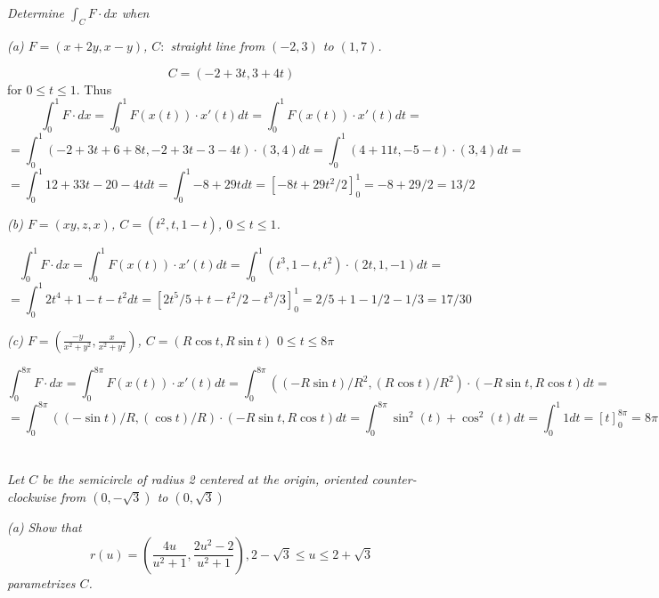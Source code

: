 \documentclass[11pt,oneside,titlepage]{book}
\begin{document}
\section{}

\textit{Determine $\int_C{F \cdot dx}$ when}

\textit{(a) $F = (x + 2y, x - y)$, $C: $ straight line from $(-2, 3)$ to $(1, 7)$.}

$$C = (-2 + 3t, 3 + 4t) $$
for $0 \leq t \leq 1$. Thus
$$\int_0^1{F \cdot dx} = \int_0^1{F(x(t)) \cdot x'(t) dt} =
\int_0^1{F(x(t)) \cdot x'(t) dt} = $$
$$ = \int_0^1{(-2 + 3t + 6 + 8t, -2 + 3t - 3 - 4t) \cdot (3, 4) dt} =
\int_0^1{(4 + 11t, -5 - t) \cdot (3, 4) dt} = 
$$
$$
=  \int_0^1{12 + 33t - 20  - 4t dt} =  \int_0^1{- 8 + 29tdt} = [-8t + 29t^2/2]_0^1 = -8 + 29/2 =
13/2
$$

\textit{(b) $F = (xy, z, x)$, $C = (t^2, t, 1 - t)$, $0 \leq t \leq 1$.}

$$\int_0^1{F \cdot dx } = \int_0^1{F(x(t)) \cdot x'(t) dt } =
\int_0^1{(t^3, 1 - t, t^2) \cdot (2t, 1, -1) dt } = $$
$$ =
\int_0^1{2t^4 + 1 - t - t^2dt } = [2t^5/5 + t - t^2/2 - t^3/3]_0^1 = 2/5 + 1 - 1/2 - 1/3 = 17/30
$$

\textit{(c) $F = (\frac{-y}{x^2 + y^2}, \frac{x}{x^2 + y^2})$, $C = (R \cos t, R \sin t)$
  $0 \leq t \leq 8\pi$}

$$\int_0^{8 \pi}{F \cdot dx } = \int_0^{8 \pi}{F(x(t)) \cdot x'(t) dt } =
\int_0^{8 \pi}{((-R \sin t)/R^2, (R \cos t)/R^2) \cdot (-R \sin t, R \cos t) dt } = 
$$
$$ =
\int_0^{8 \pi}{((- \sin t)/R, ( \cos t)/R) \cdot (-R \sin t, R \cos t) dt } =
\int_0^{8 \pi}{\sin^2(t) + \cos^2(t) dt} = \int_0^1{1 dt} = [t]_0^{8\pi} = 8 \pi
$$

\section{}

\textit{Let $C$ be the semicircle of radius 2 centered at the origin, oriented
  counter-clockwise from $(0, -\sqrt{3})$ to $(0, \sqrt{3})$}

\textit{(a) Show that
  $$r(u) = \left(\frac{4u}{u^2 + 1}, \frac{2u^2 - 2}{u^2 + 1}\right),
  2 - \sqrt{3} \leq u \leq 2 + \sqrt{3}$$
parametrizes $C$. }
\end{document}
